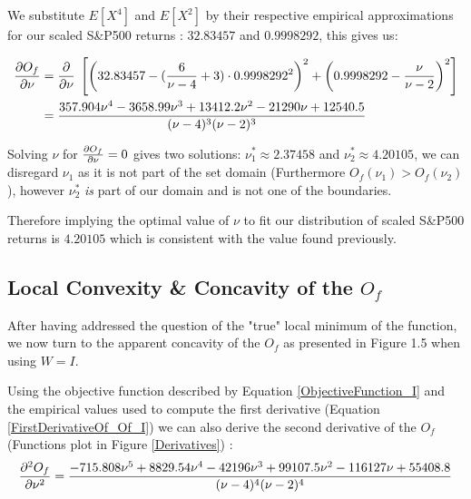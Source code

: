 We substitute $E\left[X^4\right]$ and $E\left[X^2\right]$ by their respective empirical approximations for our scaled S\&P500 returns : $32.83457$ and $0.9998292$, this gives us:

\begin{align}\label{FirstDerivativeOf_Of_I}
    \begin{split}
        \pdv{O_f}{\nu} &= \pdv{\nu} \; \left[ \left(32.83457 - (\frac{6}{\nu-4} + 3) \cdot
                            0.9998292^2 \right)^2 + \left(0.9998292 - \frac{\nu}{\nu - 2}\right)^2 \right] \\
                        &= \frac{357.904 \nu^4 - 3658.99 \nu^3 + 13412.2 \nu^2 - 21290 \nu + 12540.5}{(\nu - 4)^3 (\nu - 2)^3}
    \end{split}
\end{align}


Solving $\nu$ for  $\pdv{O_f}{\nu}=0$ gives two solutions: $\nu_1^* \approx 2.37458$ and $\nu_2^* \approx 4.20105$, we can disregard $\nu_1$ as it is not part of the set domain (Furthermore $O_f(\nu_1) > O_f(\nu_2)$), however $\nu_2^*$ \emph{is} part of our domain and is not one of the boundaries. \smallskip
\par
Therefore implying the optimal value of $\nu$ to fit our distribution of scaled S\&P500 returns is $4.20105$ which is consistent with the value found previously.

\subsection{Local Convexity \& Concavity of the $O_f$}

After having addressed the question of the "true" local minimum of the function, we now turn to the apparent concavity of the $O_f$ as presented in Figure 1.5 when using $W=I$. \bigskip\par
Using the objective function described by Equation \ref{ObjectiveFunction_I} and the empirical values used to compute the first derivative (Equation \ref{FirstDerivativeOf_Of_I}) we can also derive the second derivative of the $O_f$ (Functions plot in Figure \ref{Derivatives}) :
\begin{equation}\label{SecondDerivativeOf_Of_I}
    \pdv[2]{O_f}{\nu} =  \frac{-715.808 \nu^5 + 8829.54 \nu^4 - 42196 \nu^3 + 99107.5 \nu^2 - 116127 \nu + 55408.8}{(\nu - 4)^4 (\nu - 2)^4}
\end{equation}

